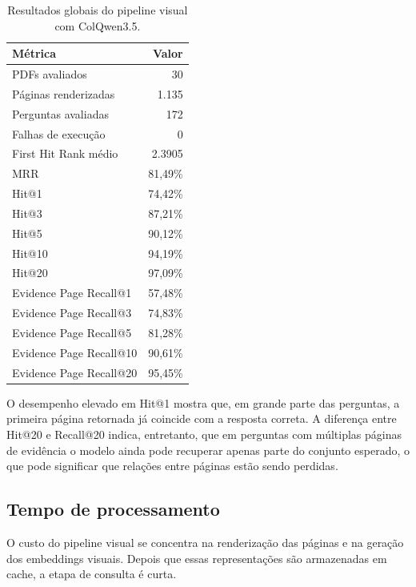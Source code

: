 \begin{table}[htbp]
\centering
\caption{Resultados globais do pipeline visual com ColQwen3.5.}
\label{tab:resultados-gerais-colvision}
\small
\begin{tabular}{p{6.6cm}r}
\toprule
\textbf{Métrica} & \textbf{Valor} \\
\midrule
PDFs avaliados & 30 \\
Páginas renderizadas & 1.135 \\
Perguntas avaliadas & 172 \\
Falhas de execução & 0 \\
First Hit Rank médio & 2.3905 \\
MRR & 81,49\% \\
\addlinespace
Hit@1 & 74,42\% \\
Hit@3 & 87,21\% \\
Hit@5 & 90,12\% \\
Hit@10 & 94,19\% \\
Hit@20 & 97,09\% \\
\addlinespace
Evidence Page Recall@1 & 57,48\% \\
Evidence Page Recall@3 & 74,83\% \\
Evidence Page Recall@5 & 81,28\% \\
Evidence Page Recall@10 & 90,61\% \\
Evidence Page Recall@20 & 95,45\% \\
\bottomrule
\end{tabular}
\end{table}

O desempenho elevado em Hit@1 mostra que, em grande parte das perguntas, a primeira página retornada já coincide com a resposta correta. A diferença entre Hit@20 e Recall@20 indica, entretanto, que em perguntas com múltiplas páginas de evidência o modelo ainda pode recuperar apenas parte do conjunto esperado, o que pode significar que relações entre páginas estão sendo perdidas.

\subsection{Tempo de processamento}
\label{subsec:colvision-tempo-processamento}

O custo do pipeline visual se concentra na renderização das páginas e na geração dos embeddings visuais. Depois que essas representações são armazenadas em cache, a etapa de consulta é curta.


